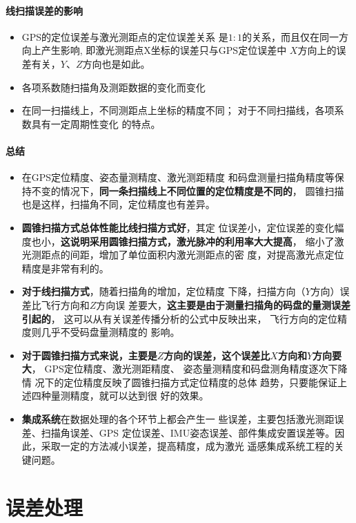 \paragraph{线扫描误差的影响}
\begin{itemize}
	\item GPS的定位误差与激光测距点的定位误差关系
		是$ 1:1 $的关系，而且仅在同一方向上产生影响,
		即激光测距点X坐标的误差只与GPS定位误差中
		$ X $方向上的误差有关，$ Y $、$ Z $方向也是如此。
	\item 各项系数随扫描角及测距数据的变化而变化
	\item 在同一扫描线上，不同测距点上坐标的精度不同；
		对于不同扫描线，各项系数具有一定周期性变化
		的特点。
\end{itemize}

\paragraph{总结}
\begin{itemize}
	\item 在GPS定位精度、姿态量测精度、激光测距精度
		和码盘测量扫描角精度等保持不变的情况下，\textbf{同一条扫描线上不同位置的定位精度是不同的}，
		圆锥扫描也是这样，扫描角不同，定位精度也有差异。
	\item \textbf{圆锥扫描方式总体性能比线扫描方式好}，其定
		位误差小，定位误差的变化幅度也小，\textbf{这说明采用圆锥扫描方式，激光脉冲的利用率大大提高}，
		缩小了激光测距点的间距，增加了单位面积内激光测距点的密
		度，对提高激光点定位精度是非常有利的。
	\item \textbf{对于线扫描方式}，随着扫描角的增加，定位精度
		下降，扫描方向（$ Y $方向）误差比飞行方向和$ Z $方向误
		差要大，\textbf{这主要是由于测量扫描角的码盘的量测误差引起的}，
		这可以从有关误差传播分析的公式中反映出来，
		飞行方向的定位精度则几乎不受码盘量测精度的
		影响。
	\item \textbf{对于圆锥扫描方式来说，主要是$ Z $方向的误差，这个误差比$ X $方向和$ Y $方向要大}，
		GPS定位精度、激光测距精度、
		姿态量测精度和码盘测角精度逐次下降情
		况下的定位精度反映了圆锥扫描方式定位精度的总体
		趋势，只要能保证上述四种量测精度，就可以达到很
		好的效果。
	\item \textbf{集成系统}在数据处理的各个环节上都会产生一
		些误差，主要包括激光测距误差、扫描角误差、GPS
		定位误差、IMU姿态误差、部件集成安置误差等。因
		此，采取一定的方法减小误差，提高精度，成为激光
		遥感集成系统工程的关键问题。
\end{itemize}

\section{误差处理}
